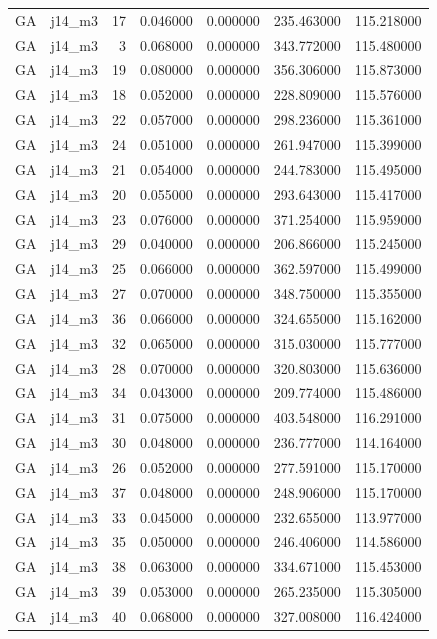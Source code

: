 \begin{tabular}{llrrrrr}
GA & j14_m3 & 17 & 0.046000 & 0.000000 & 235.463000 & 115.218000 \\
GA & j14_m3 & 3 & 0.068000 & 0.000000 & 343.772000 & 115.480000 \\
GA & j14_m3 & 19 & 0.080000 & 0.000000 & 356.306000 & 115.873000 \\
GA & j14_m3 & 18 & 0.052000 & 0.000000 & 228.809000 & 115.576000 \\
GA & j14_m3 & 22 & 0.057000 & 0.000000 & 298.236000 & 115.361000 \\
GA & j14_m3 & 24 & 0.051000 & 0.000000 & 261.947000 & 115.399000 \\
GA & j14_m3 & 21 & 0.054000 & 0.000000 & 244.783000 & 115.495000 \\
GA & j14_m3 & 20 & 0.055000 & 0.000000 & 293.643000 & 115.417000 \\
GA & j14_m3 & 23 & 0.076000 & 0.000000 & 371.254000 & 115.959000 \\
GA & j14_m3 & 29 & 0.040000 & 0.000000 & 206.866000 & 115.245000 \\
GA & j14_m3 & 25 & 0.066000 & 0.000000 & 362.597000 & 115.499000 \\
GA & j14_m3 & 27 & 0.070000 & 0.000000 & 348.750000 & 115.355000 \\
GA & j14_m3 & 36 & 0.066000 & 0.000000 & 324.655000 & 115.162000 \\
GA & j14_m3 & 32 & 0.065000 & 0.000000 & 315.030000 & 115.777000 \\
GA & j14_m3 & 28 & 0.070000 & 0.000000 & 320.803000 & 115.636000 \\
GA & j14_m3 & 34 & 0.043000 & 0.000000 & 209.774000 & 115.486000 \\
GA & j14_m3 & 31 & 0.075000 & 0.000000 & 403.548000 & 116.291000 \\
GA & j14_m3 & 30 & 0.048000 & 0.000000 & 236.777000 & 114.164000 \\
GA & j14_m3 & 26 & 0.052000 & 0.000000 & 277.591000 & 115.170000 \\
GA & j14_m3 & 37 & 0.048000 & 0.000000 & 248.906000 & 115.170000 \\
GA & j14_m3 & 33 & 0.045000 & 0.000000 & 232.655000 & 113.977000 \\
GA & j14_m3 & 35 & 0.050000 & 0.000000 & 246.406000 & 114.586000 \\
GA & j14_m3 & 38 & 0.063000 & 0.000000 & 334.671000 & 115.453000 \\
GA & j14_m3 & 39 & 0.053000 & 0.000000 & 265.235000 & 115.305000 \\
GA & j14_m3 & 40 & 0.068000 & 0.000000 & 327.008000 & 116.424000 \\

\end{tabular}
